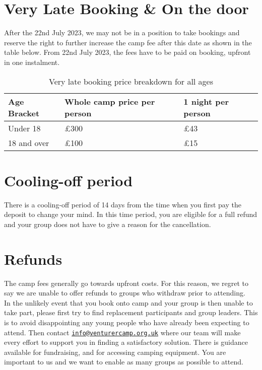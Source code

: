 \section{Very Late Booking \& On the door}
After the 22nd July 2023, we may not be in a position to take bookings and reserve the right to further increase the camp fee after this date as shown in the table below. From 22nd July 2023, the fees have to be paid on booking, upfront in one instalment. 
\begin{table}[H]
    \centering   
    \begin{tabularx}{0.9\textwidth}{XXX}
        \textbf{Age Bracket} & \textbf{Whole camp price per person} & \textbf{1 night per person} \\
        \hline
        \hline
        Under 18 & £300 & £43\\
        \hline
        18 and over & £100 & £15\\
        \hline
    \end{tabularx}
    \caption{Very late booking price breakdown for all ages}
\end{table}

\section{Cooling-off period}
There is a cooling-off period of 14 days from the time when you first pay the deposit to change your mind. In this time period, you are eligible for a full refund and your group does not have to give a reason for the cancellation.

\section{Refunds}
The camp fees generally go towards upfront costs.  For this reason, we regret to say we are unable to offer refunds to groups who withdraw prior to attending.\\[1em]
In the unlikely event that you book onto camp and your group is then unable to take part, please first try to find replacement participants and group leaders. This is to avoid disappointing any young people who have already been expecting to attend. Then contact \href{mailto:info@venturercamp.org.uk}{\texttt{info@venturercamp.org.uk}} where our team will make every effort to support you in finding a satisfactory solution. There is guidance available for fundraising, and for accessing camping equipment. You are important to us and we want to enable as many groups as possible to attend.\\

